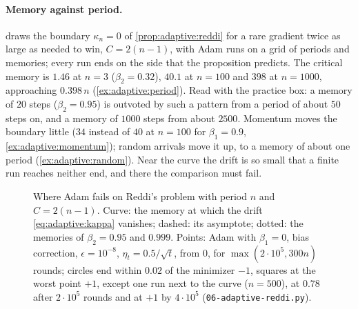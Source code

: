 \begin{refsection}
\paragraph{Memory against period.}  draws the boundary $\kappa_n=0$ of \cref{prop:adaptive:reddi} for a rare gradient twice as large as needed to win, $C=2(n-1)$, with Adam runs on a grid of periods and memories; every run ends on the side that the proposition predicts. The critical memory is $1.46$ at $n=3$ ($\beta_2=0.32$), $40.1$ at $n=100$ and $398$ at $n=1000$, approaching $0.398\,n$ (\cref{ex:adaptive:period}). Read with the practice box: a memory of $20$ steps ($\beta_2=0.95$) is outvoted by such a pattern from a period of about $50$ steps on, and a memory of $1000$ steps from about $2500$. Momentum moves the boundary little ($34$ instead of $40$ at $n=100$ for $\beta_1=0.9$, \cref{ex:adaptive:momentum}); random arrivals move it up, to a memory of about one period (\cref{ex:adaptive:random}). Near the curve the drift is so small that a finite run reaches neither end, and there the comparison must fail.

\begin{figure}[t]
\centering
{}
\caption{Where Adam fails on Reddi's problem with period $n$ and $C=2(n-1)$. Curve: the memory at which the drift \eqref{eq:adaptive:kappa} vanishes; dashed: its asymptote; dotted: the memories of $\beta_2=0.95$ and $0.999$. Points: Adam with $\beta_1=0$, bias correction, $\epsilon=10^{-8}$, $\eta_t=0.5/\sqrt t$, from $0$, for $\max(2\cdot10^5,300n)$ rounds; circles end within $0.02$ of the minimizer $-1$, squares at the worst point $+1$, except one run next to the curve ($n=500$), at $0.78$ after $2\cdot10^5$ rounds and at $+1$ by $4\cdot10^5$ (\texttt{06-adaptive-reddi.py}).}
\label{fig:adaptive:reddi}
\end{figure}


\end{refsection}
